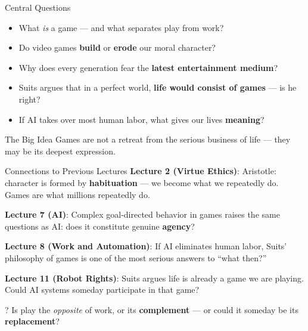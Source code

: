 \documentclass[aspectratio=169,11pt]{beamer}
\begin{document}
\begin{frame}{Central Questions}
\begin{itemize}
    \item What \emph{is} a game --- and what separates play from work?
    \item Do video games \textbf{build} or \textbf{erode} our moral character?
    \item Why does every generation fear the \textbf{latest entertainment medium}?
    \item Suits argues that in a perfect world, \textbf{life would consist of games} --- is he right?
    \item If AI takes over most human labor, what gives our lives \textbf{meaning}?
\end{itemize}

\vspace{0.2cm}
\begin{alertblock}{The Big Idea}
Games are not a retreat from the serious business of life --- they may be its deepest expression.
\end{alertblock}
\end{frame}

\begin{frame}{Connections to Previous Lectures}
\footnotesize
\textbf{Lecture 2 (Virtue Ethics)}: Aristotle: character is formed by \textbf{habituation} --- we become what we repeatedly do. Games are what millions repeatedly do.

\vspace{0.12cm}
\textbf{Lecture 7 (AI)}: Complex goal-directed behavior in games raises the same questions as AI: does it constitute genuine \textbf{agency}?

\vspace{0.12cm}
\textbf{Lecture 8 (Work and Automation)}: If AI eliminates human labor, Suits' philosophy of games is one of the most serious answers to ``what then?''

\vspace{0.12cm}
\textbf{Lecture 11 (Robot Rights)}: Suits argues life is already a game we are playing. Could AI systems someday participate in that game?

\begin{alertblock}{?}
Is play the \emph{opposite} of work, or its \textbf{complement} --- or could it someday be its \textbf{replacement}?
\end{alertblock}
\end{frame}
\end{document}
